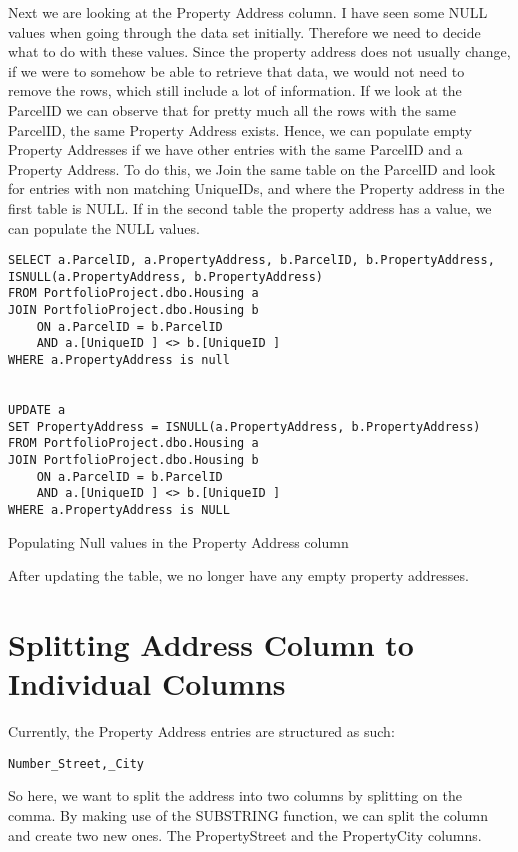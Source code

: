 \documentclass[11pt]{article}
\begin{document}
Next we are looking at the Property Address column. I have seen some NULL values when going through the data set initially.
Therefore we need to decide what to do with these values. Since the property address does not usually change, if we were to somehow be able to retrieve that data, we would not need to remove the rows, which still include a lot of information.
If we look at the ParcelID we can observe that for pretty much all the rows with the same ParcelID, the same Property Address exists.
Hence, we can populate empty Property Addresses if we have other entries with the same ParcelID and a Property Address.
To do this, we Join the same table on the ParcelID and look for entries with non matching UniqueIDs, and where the Property address in the first table is NULL.
If in the second table the property address has a value, we can populate the NULL values.
\begin{lstlisting}
SELECT a.ParcelID, a.PropertyAddress, b.ParcelID, b.PropertyAddress, ISNULL(a.PropertyAddress, b.PropertyAddress)
FROM PortfolioProject.dbo.Housing a
JOIN PortfolioProject.dbo.Housing b
	ON a.ParcelID = b.ParcelID
	AND a.[UniqueID ] <> b.[UniqueID ]
WHERE a.PropertyAddress is null


UPDATE a 
SET PropertyAddress = ISNULL(a.PropertyAddress, b.PropertyAddress)
FROM PortfolioProject.dbo.Housing a
JOIN PortfolioProject.dbo.Housing b
	ON a.ParcelID = b.ParcelID
	AND a.[UniqueID ] <> b.[UniqueID ]
WHERE a.PropertyAddress is NULL
\end{lstlisting}
\caption{Populating Null values in the Property Address column}

After updating the table, we no longer have any empty property addresses.

\section{Splitting Address Column to Individual Columns}
Currently, the Property Address entries are structured as such:

\texttt{Number\_Street,\_City}

So here, we want to split the address into two columns by splitting on the comma. By making use of the SUBSTRING function, we can split the column and create two new ones.
The PropertyStreet and the PropertyCity columns.
\end{document}
